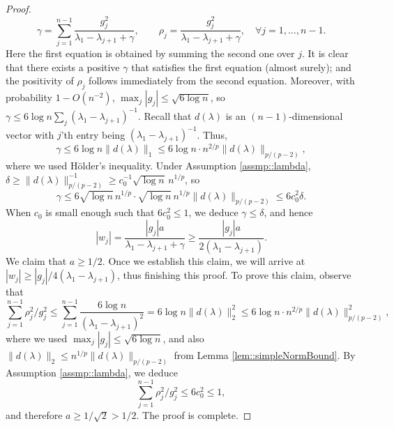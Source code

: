 \documentclass[12pt]{article}%
\theoremstyle{plain}%
\theoremstyle{remark}
\begin{document}
\begin{proof}
\begin{equation*}
\gamma = \sum_{j=1}^{n-1}\frac{g_j^2}{\lambda_1 - \lambda_{j+1} + \gamma}, \qquad \rho_j = \frac{g_j^2}{\lambda_1 - \lambda_{j+1} + \gamma}, \quad \forall j=1,\ldots, n-1.
\end{equation*}
Here the first equation is obtained by summing the second one over $j$. It is clear that there exists a positive $\gamma$ that satisfies the first equation (almost surely); and the positivity of $\rho_j$ follows immediately from the second equation. Moreover, with probability $1 - O(n^{-2})$, $\max_j |g_j| \le \sqrt{6\log n}$, so $\gamma \le 6\log n \sum_j   (\lambda_1 - \lambda_{j+1})^{-1}$. Recall that $d(\lambda)$ is an $(n-1)$-dimensional vector with $j$'th entry being $(\lambda_1 - \lambda_{j+1})^{-1}$. Thus,
\begin{equation*}
\gamma \le 6 \log n \| d(\lambda) \|_1 \le 6 \log n \cdot n^{2/p} \| d(\lambda) \|_{p/(p-2)}, 
\end{equation*}
where we used H\"{o}lder's inequality. Under Assumption \ref{assmp::lambda}, $\delta \ge \| d(\lambda) \|_{p/(p-2)}^{-1} \ge c_0^{-1} \sqrt{\log n}\, n^{1/p}$, so
\begin{equation*}
\gamma \le 6 \sqrt{\log n} \, n^{1/p} \cdot \sqrt{\log n}\, n^{1/p} \| d(\lambda) \|_{p/(p-2)} \le 6 c_0^2 \delta.
\end{equation*}
When $c_0$ is small enough such that $6 c_0^2 \le 1$, we deduce $\gamma \le \delta$, and hence
\begin{equation*}
| w_j | = \frac{ |g_j| a }{\lambda_1 - \lambda_{j+1} + \gamma} \ge \frac{ |g_j| a }{2(\lambda_1 - \lambda_{j+1})}.
\end{equation*}
We claim that $a \ge 1/2$. Once we establish this claim, we will arrive at $|w_j| \ge |g_j|/4(\lambda_1 - \lambda_{j+1})$, thus finishing this proof. To prove this claim, observe that 
\begin{equation*}
\sum_{j=1}^{n-1} \rho_j^2 / g_j^2 \le \sum_{j=1}^{n-1} \frac{6\log n}{(\lambda_1 - \lambda_{j+1})^2} = 6 \log n \| d(\lambda) \|_2^2 \le 6 \log n \cdot n^{2/p} \| d(\lambda) \|_{p/(p-2)}^2,
\end{equation*}
where we used $\max_j |g_j| \le \sqrt{6\log n}$, and also $\| d(\lambda) \|_2 \le n^{1/p} \| d(\lambda) \|_{p/(p-2)}$ from Lemma \ref{lem::simpleNormBound}. By Assumption \ref{assmp::lambda}, we deduce
\begin{equation*}
\sum_{j=1}^{n-1} \rho_j^2 / g_j^2 \le 6c_0^2 \le 1,
\end{equation*}
and therefore $a \ge 1/\sqrt{2} > 1/2$. The proof is complete.
\end{proof}
\end{document}
